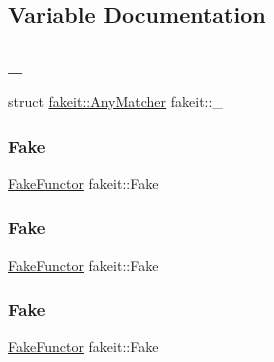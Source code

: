 \subsection{Variable Documentation}
\mbox{\label{namespacefakeit_ab25a4592bc99cfb5347f30b2997d1187}} 
\subsubsection{\texorpdfstring{\_}{\_}}
{\footnotesize\ttfamily struct \mbox{\hyperlink{structfakeit_1_1AnyMatcher}{fakeit\+::\+Any\+Matcher}} fakeit\+::\+\_\+}

\mbox{\label{namespacefakeit_a8162a4e2e05662a6ce810ae0b9a7f89e}} 
\subsubsection{\texorpdfstring{Fake}{Fake}\hspace{0.1cm}{\footnotesize\ttfamily [1/9]}}
{\footnotesize\ttfamily \mbox{\hyperlink{classfakeit_1_1FakeFunctor}{Fake\+Functor}} fakeit\+::\+Fake\hspace{0.3cm}{\ttfamily [static]}}

\mbox{\label{namespacefakeit_a8162a4e2e05662a6ce810ae0b9a7f89e}} 
\subsubsection{\texorpdfstring{Fake}{Fake}\hspace{0.1cm}{\footnotesize\ttfamily [2/9]}}
{\footnotesize\ttfamily \mbox{\hyperlink{classfakeit_1_1FakeFunctor}{Fake\+Functor}} fakeit\+::\+Fake\hspace{0.3cm}{\ttfamily [static]}}

\mbox{\label{namespacefakeit_a8162a4e2e05662a6ce810ae0b9a7f89e}} 
\subsubsection{\texorpdfstring{Fake}{Fake}\hspace{0.1cm}{\footnotesize\ttfamily [3/9]}}
{\footnotesize\ttfamily \mbox{\hyperlink{classfakeit_1_1FakeFunctor}{Fake\+Functor}} fakeit\+::\+Fake\hspace{0.3cm}{\ttfamily [static]}}

